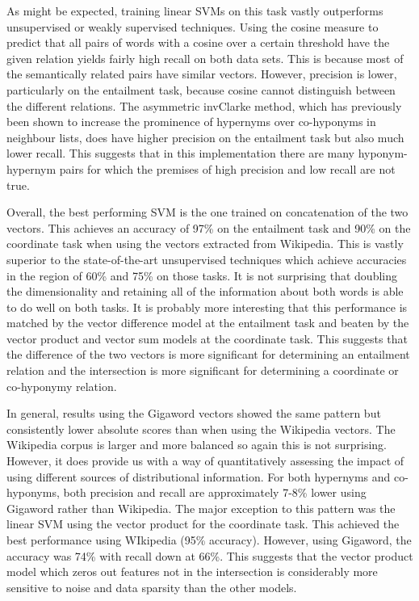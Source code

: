 \documentclass[11pt]{article}
\begin{document}
As might be expected, training linear SVMs on this task vastly outperforms unsupervised or weakly supervised techniques.  Using the cosine measure to predict that all pairs of words with a cosine over a certain threshold have the given relation yields fairly high recall on both data sets.  This is because most of the semantically related pairs have similar vectors.  However, precision is lower, particularly on the entailment task, because cosine cannot distinguish between the different relations.  The asymmetric invClarke method, which has previously been shown to increase the prominence of hypernyms over co-hyponyms in neighbour lists, does have higher precision on the entailment task but also much lower recall.  This suggests that in this implementation there are many hyponym-hypernym pairs for which the premises of high precision and low recall are not true.

Overall, the best performing SVM is the one trained on concatenation of the two vectors.  This achieves an accuracy of 97\% on the entailment task and 90\% on the coordinate task when using the vectors extracted from Wikipedia.  This is vastly superior to the state-of-the-art unsupervised techniques which achieve accuracies in the region of 60\% and 75\% on those tasks.  It is not surprising that doubling the dimensionality and retaining all of the information about both words is able to do well on both tasks.  It is probably more interesting that this performance is matched by the vector difference model at the entailment task and beaten by the vector product and vector sum models at the coordinate task.  This suggests that the difference of the two vectors is more significant for determining an entailment relation and the intersection is more significant for determining a coordinate or co-hyponymy relation.

In general, results using the Gigaword vectors showed the same pattern but consistently lower absolute scores than when using the Wikipedia vectors.  The Wikipedia corpus is larger and more balanced so again this is not surprising.  However, it does provide us with a way of quantitatively assessing the impact of using different sources of distributional information.  For both hypernyms and co-hyponyms, both precision and recall are approximately 7-8\% lower using Gigaword rather than Wikipedia.  The major exception to this pattern was the linear SVM using the vector product for the coordinate task.  This achieved the best performance using WIkipedia (95\% accuracy).  However, using Gigaword, the accuracy was 74\% with recall down at 66\%.  This suggests that the vector product model which zeros out features not in the intersection is considerably more sensitive to noise and data sparsity than the other models.
\end{document}
